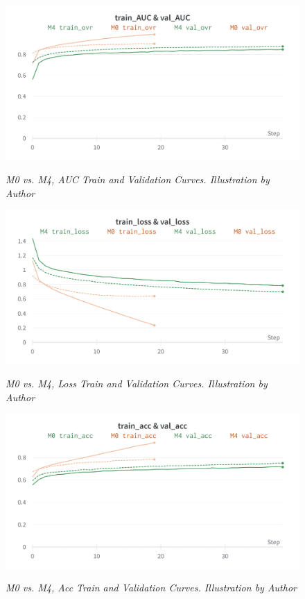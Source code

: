 \begin{figure}[H]
\centering
    \includegraphics[width=\textwidth]{imatges/results/AUCM0M4.png}
\caption[M0 vs. M4, AUC Train and Validation Curves]{\textit{M0 vs. M4, AUC Train and Validation Curves. Illustration by Author}}
{\label{fig:aucm0m4}}
\end{figure}

\newpage

\begin{figure}[H]
\centering
    \includegraphics[width=\textwidth]{imatges/results/LossM0M4.png}
\caption[M0 vs. M4, Loss Train and Validation Curves]{\textit{M0 vs. M4, Loss Train and Validation Curves. Illustration by Author}}
{\label{fig:lossm0m4}}
\end{figure}

\begin{figure}[H]
\centering
    \includegraphics[width=\textwidth]{imatges/results/AccM0M4.png}
\caption[M0 vs. M4, Acc Train and Validation Curves]{\textit{M0 vs. M4, Acc Train and Validation Curves. Illustration by Author}}
{\label{fig:accm0m4}}
\end{figure}

